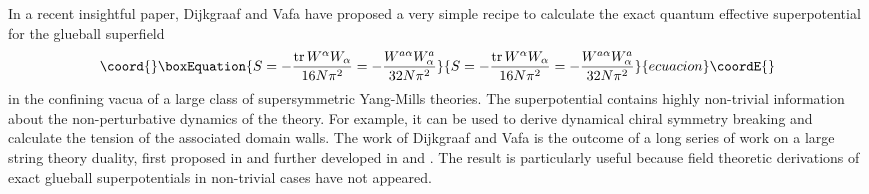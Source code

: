 \documentclass[a4paper,12pt]{article}
\def\tr{\mathop{\rm tr}\nolimits}
\begin{document}
In a recent insightful paper, Dijkgraaf and Vafa \cite{DV} have 
proposed a very simple recipe to calculate the exact quantum effective 
superpotential \coordHE{} for the glueball superfield
%
\begin{equation}\coord{}\boxEquation{
\label{Sdef}
S = -{\tr W^{\alpha}W_{\alpha}\over 16N\pi^{2}} = 
-{W^{a\alpha}W_{\alpha}^{a}\over 32N\pi^{2}}
}{
S = -{\tr W^{\alpha}W_{\alpha}\over 16N\pi^{2}} = 
-{W^{a\alpha}W_{\alpha}^{a}\over 32N\pi^{2}}
}{ecuacion}\coordE{}\end{equation}
%
in the confining vacua of 
a large class of \coordHE{} supersymmetric Yang-Mills theories. The 
superpotential \coordHE{} contains highly non-trivial information about 
the non-perturbative dynamics of the theory. For example, 
it can be used to derive 
dynamical chiral symmetry breaking and calculate the tension of 
the associated domain walls. The work of Dijkgraaf and Vafa is the 
outcome of a long series of work on a large \coordHE{} string theory 
duality, first proposed in \cite{GV} and further developed in \cite{CIV} 
and \cite{DV1}. The result is particularly useful because field 
theoretic derivations of exact glueball superpotentials in non-trivial 
cases have not appeared.
\end{document}
